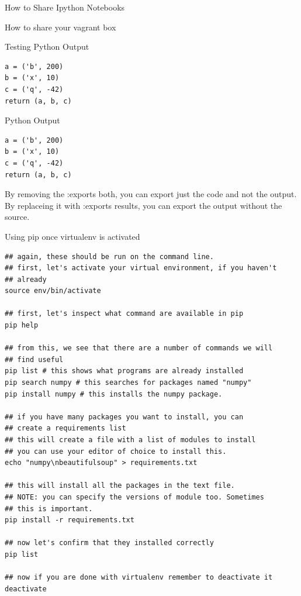 \documentclass[presentation]{beamer}
\begin{document}
\begin{frame}[label=sec-9-0-3]{How to Share Ipython Notebooks}
\end{frame}
\begin{frame}[label=sec-9-0-4]{How to share your vagrant box}
\end{frame}
\begin{frame}[fragile,label=sec-9-0-5]{Testing Python Output}
 \lstset{numbers=left,language=Python,label= ,caption= }
\begin{lstlisting}
a = ('b', 200)
b = ('x', 10)
c = ('q', -42)
return (a, b, c)
\end{lstlisting}
\end{frame}

\begin{frame}[fragile,label=sec-9-0-6]{Python Output}
 \lstset{numbers=left,language=Python,label= ,caption= }
\begin{lstlisting}
a = ('b', 200)
b = ('x', 10)
c = ('q', -42)
return (a, b, c)
\end{lstlisting}

By removing the :exports both, you can export just the code and not the output. By replaceing it with :exports results, you can export the output without the source. 
\end{frame}

\begin{frame}[fragile,shrink=1,label=sec-9-0-7]{Using pip once virtualenv is activated}

 \lstset{numbers=left,language=sh,label= ,caption= }
\begin{lstlisting}
## again, these should be run on the command line. 
## first, let's activate your virtual environment, if you haven't 
## already
source env/bin/activate

## first, let's inspect what command are available in pip
pip help

## from this, we see that there are a number of commands we will 
## find useful
pip list # this shows what programs are already installed
pip search numpy # this searches for packages named "numpy"
pip install numpy # this installs the numpy package. 

## if you have many packages you want to install, you can 
## create a requirements list
## this will create a file with a list of modules to install
## you can use your editor of choice to install this. 
echo "numpy\nbeautifulsoup" > requirements.txt

## this will install all the packages in the text file. 
## NOTE: you can specify the versions of module too. Sometimes
## this is important. 
pip install -r requirements.txt

## now let's confirm that they installed correctly
pip list 

## now if you are done with virtualenv remember to deactivate it
deactivate
\end{lstlisting}
\end{frame}
\end{document}

